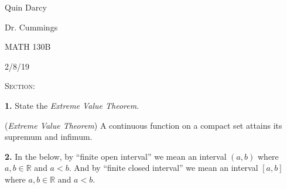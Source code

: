 \documentclass[12pt, a4paper]{article}
\begin{document}
  
\begin{flushleft}
  
    Quin Darcy\par
    Dr. Cummings\par
    MATH 130B\par
    2/8/19
  
\end{flushleft}
  
\centerline{}
 
\vspace{4mm}
 
\noindent\textsc{Section: }\par
 
\justifying
 
\vspace{1mm}
 
\hline
 
\vspace{6mm}

\noindent\textbf{1.} State the \textit{Extreme Value Theorem}.

\begin{description}
    \item(\textit{Extreme Value Theorem}) A continuous function on a compact set attains its supremum and infimum. 
\end{description}

\vspace{2mm}

\noindent\textbf{2.} In the below, by ``finite open interval'' we mean an interval $(a,b)$ where $a,b\in\mathbb{R}$ and $a<b$. And by ``finite closed interval'' we mean an interval $[a,b]$ where $a,b\in\mathbb{R}$ and $a<b$.
\end{document}
